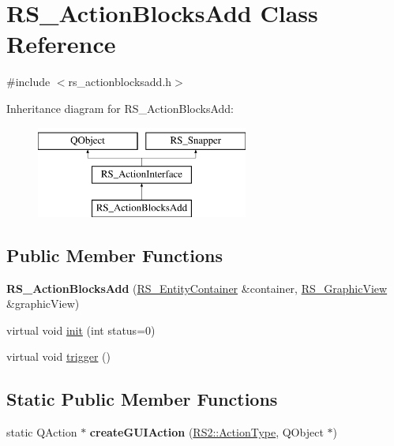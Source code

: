 \hypertarget{classRS__ActionBlocksAdd}{\section{R\-S\-\_\-\-Action\-Blocks\-Add Class Reference}
\label{classRS__ActionBlocksAdd}
}


{\ttfamily \#include $<$rs\-\_\-actionblocksadd.\-h$>$}

Inheritance diagram for R\-S\-\_\-\-Action\-Blocks\-Add\-:\begin{figure}[H]
\begin{center}
\leavevmode
\includegraphics[height=3.000000cm]{classRS__ActionBlocksAdd}
\end{center}
\end{figure}
\subsection*{Public Member Functions}
\begin{DoxyCompactItemize}
\item 
\hypertarget{classRS__ActionBlocksAdd_ab0e8033b92c4e14859616541e787a44c}{{\bfseries R\-S\-\_\-\-Action\-Blocks\-Add} (\hyperlink{classRS__EntityContainer}{R\-S\-\_\-\-Entity\-Container} \&container, \hyperlink{classRS__GraphicView}{R\-S\-\_\-\-Graphic\-View} \&graphic\-View)}\label{classRS__ActionBlocksAdd_ab0e8033b92c4e14859616541e787a44c}

\item 
virtual void \hyperlink{classRS__ActionBlocksAdd_a124985da526aa3264a6a5a2b4066f2aa}{init} (int status=0)
\item 
virtual void \hyperlink{classRS__ActionBlocksAdd_a9952a17b50fdbfcfd0225e6c3e9fe989}{trigger} ()
\end{DoxyCompactItemize}
\subsection*{Static Public Member Functions}
\begin{DoxyCompactItemize}
\item 
\hypertarget{classRS__ActionBlocksAdd_a781f5bd776ca51bb2c45ae011e072d38}{static Q\-Action $\ast$ {\bfseries create\-G\-U\-I\-Action} (\hyperlink{classRS2_afe3523e0bc41fd637b892321cfc4b9d7}{R\-S2\-::\-Action\-Type}, Q\-Object $\ast$)}\label{classRS__ActionBlocksAdd_a781f5bd776ca51bb2c45ae011e072d38}

\end{DoxyCompactItemize}
